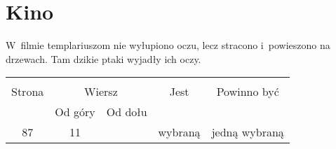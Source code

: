 \documentclass[a4paper,11pt]{article}
\begin{document}





























\newpage

\section{Kino}

\vspace{\spaceTwo}







\start {} W~filmie templariuszom nie wyłupiono oczu, lecz
stracono i~powieszono na drzewach. Tam dzikie ptaki wyjadły ich oczy.







\begin{center}

  \begin{tabular}{|c|c|c|c|c|}
    \hline
    & \multicolumn{2}{c|}{} & & \\
    Strona & \multicolumn{2}{c|}{Wiersz} & Jest
                              & Powinno być \\ \cline{2-3}
    & Od góry & Od dołu & & \\
    \hline
    87 & 11 & & wybraną & jedną wybraną \\
    \hline
  \end{tabular}

\end{center}
\end{document}
